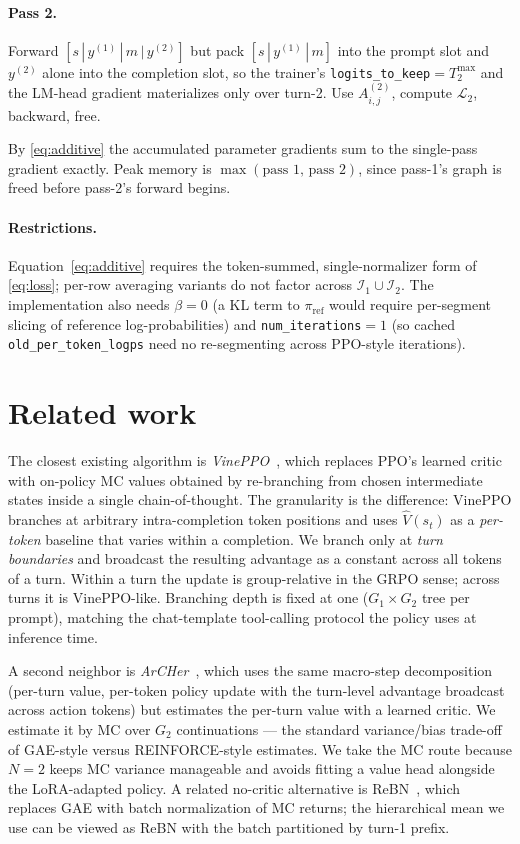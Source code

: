 \documentclass[11pt,a4paper]{article}
\begin{document}
\paragraph{Pass 2.} Forward
$[s\,|\,y^{(1)}\,|\,m\,|\,y^{(2)}]$ but pack
$[s\,|\,y^{(1)}\,|\,m]$ into the prompt slot and $y^{(2)}$ alone into
the completion slot, so the trainer's
\texttt{logits\_to\_keep}$=T_2^{\max}$ and the LM-head gradient
materializes only over turn-2. Use $A^{(2)}_{i,j}$, compute
$\mathcal{L}_2$, backward, free.

By \eqref{eq:additive} the accumulated parameter gradients sum to the
single-pass gradient exactly. Peak memory is
$\max(\text{pass 1, pass 2})$, since pass-1's graph is freed before
pass-2's forward begins.

\paragraph{Restrictions.}
Equation~\eqref{eq:additive} requires the token-summed,
single-normalizer form of \eqref{eq:loss}; per-row averaging variants
do not factor across $\mathcal{I}_1\cup\mathcal{I}_2$. The
implementation also needs $\beta=0$ (a KL term to $\pi_{\text{ref}}$
would require per-segment slicing of reference log-probabilities) and
\texttt{num\_iterations}$=1$ (so cached
\texttt{old\_per\_token\_logps} need no re-segmenting across PPO-style
iterations).

\section{Related work}

The closest existing algorithm is
\emph{VinePPO}~\cite{kazemnejad2024vineppo}, which replaces PPO's
learned critic with on-policy MC values obtained by re-branching from
chosen intermediate states inside a single chain-of-thought. The
granularity is the difference: VinePPO branches at arbitrary
intra-completion token positions and uses $\widehat V(s_t)$ as a
\emph{per-token} baseline that varies within a completion. We branch
only at \emph{turn boundaries} and broadcast the resulting advantage
as a constant across all tokens of a turn. Within a turn the update is
group-relative in the GRPO sense; across turns it is VinePPO-like.
Branching depth is fixed at one ($G_1\times G_2$ tree per prompt),
matching the chat-template tool-calling protocol the policy uses at
inference time.

A second neighbor is \emph{ArCHer}~\cite{zhou2024archer}, which uses
the same macro-step decomposition (per-turn value, per-token policy
update with the turn-level advantage broadcast across action tokens)
but estimates the per-turn value with a learned critic. We estimate
it by MC over $G_2$ continuations --- the standard variance/bias
trade-off of GAE-style versus REINFORCE-style estimates. We take the
MC route because $N=2$ keeps MC variance manageable and avoids
fitting a value head alongside the LoRA-adapted policy. A related
no-critic alternative is ReBN~\cite{liu2025gem}, which replaces GAE
with batch normalization of MC returns; the hierarchical mean we use
can be viewed as ReBN with the batch partitioned by turn-1 prefix.
\end{document}
